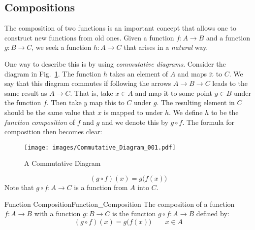     \subsection{Compositions}
        The composition of two functions is an important concept that allows
        one to construct new functions from old ones. Given a function
        $f:A\rightarrow{B}$ and a function $g:B\rightarrow{C}$, we seek a
        function $h:A\rightarrow{C}$ that arises in a \textit{natural} way.
        \par\hfill\par
        \begin{minipage}[lt]{0.6\textwidth}
            One way to describe this is by using
            \textit{commutative diagrams}. Consider
            the diagram in Fig.~\ref{fig:Commutative_Diagram_Func_Comp}. The
            function $h$ takes an element of $A$ and maps it to $C$. We say that
            this diagram commutes if following the arrows
            $A\rightarrow{B}\rightarrow{C}$ leads to the same result as
            $A\rightarrow{C}$. That is, take $x\in{A}$ and map it to some point
            $y\in{B}$ under the function $f$. Then take $y$ map this to $C$
            under $g$. The resulting element in $C$ should be the same value
            that $x$ is mapped to under $h$. We define $h$ to be the
            \textit{function composition} of $f$ and
            $g$ and we denote this by $g\circ{f}$. The formula for composition
            then becomes clear:
        \end{minipage}
        \hfill
        \begin{minipage}[rt]{0.35\textwidth}
            \centering
            \begin{figure}[H]
                \centering
                \captionsetup{type=figure}
                \texttt{[image: images/Commutative\_Diagram\_001.pdf]}
                \caption{A Commutative Diagram}
                \label{fig:Commutative_Diagram_Func_Comp}
            \end{figure}
        \end{minipage}
        \begin{equation}
            (g\circ{f})(x)=g\big(f(x)\big)
        \end{equation}
        Note that $g\circ{f}:A\rightarrow{C}$ is a function from $A$ into $C$.
        \begin{fdefinition}{Function Composition}{Function_Composition}
            The composition of a function $f:A\rightarrow{B}$ with a function
            $g:B\rightarrow{C}$ is the function $g\circ{f}:A\rightarrow{B}$
            defined by:
            \begin{equation*}
                (g\circ{f})(x)=g\big(f(x)\big)
                \quad\quad
                x\in{A}
            \end{equation*}
        \end{fdefinition}
